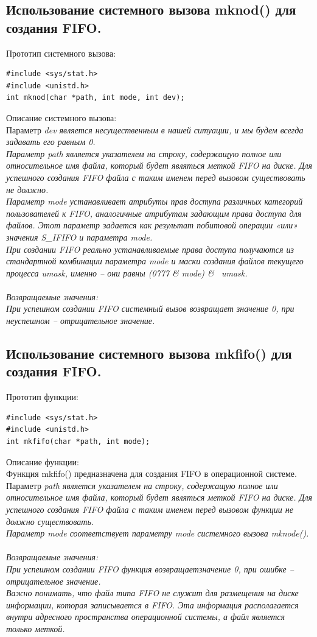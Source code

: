 \documentclass[a4paper]{article}
\begin{document}
\subsection{\Large Использование системного вызова mknod() для создания FIFO.}
Прототип системного вызова:
\begin{verbatim}
#include <sys/stat.h>
#include <unistd.h>
int mknod(char *path, int mode, int dev);  
\end{verbatim}
Описание системного вызова:\\
Параметр \sl dev \rm является несущественным в нашей ситуации, и мы будем всегда задавать его равным 0.\\
Параметр \sl path \rm является указателем на строку, содержащую полное или относительное имя файла, который будет являться меткой FIFO на диске. Для успешного создания FIFO файла с таким именем перед вызовом существовать не должно.\\
Параметр \sl mode \rm устанавливает атрибуты прав доступа различных категорий пользователей к FIFO, аналогичные атрибутам задающим права доступа для файлов. Этот параметр задается как результат побитовой операции «или» значения S\_IFIFO и параметра mode.\\
При создании FIFO реально устанавливаемые права доступа получаются из стандартной комбинации параметра \sl mode \rm и маски создания файлов текущего процесса \sl umask, \rm именно – они равны \sl (0777 \& mode) \& ~umask.\\\\
\rm Возвращаемые значения:\\
При успешном создании FIFO системный вызов возвращает значение 0, при неуспешном – отрицательное значение.

\subsection{\Large Использование системного вызова mkfifo() для создания FIFO.}
Прототип функции:
\begin{verbatim}
#include <sys/stat.h>
#include <unistd.h>
int mkfifo(char *path, int mode);  
\end{verbatim}
Описание функции:\\
Функция mkfifo() предназначена для создания FIFO в операционной системе.\\
Параметр \sl path \rm является указателем на строку, содержащую полное или относительное имя файла, который будет являться меткой FIFO на диске. Для успешного создания FIFO файла с таким именем перед вызовом функции не должно существовать.\\
Параметр \sl mode \rm соответствует параметру mode системного вызова mknode().\\\\
Возвращаемые значения:\\
При успешном создании FIFO функция возвращаетзначение 0, при ошибке – отрицательное значение.\\
Важно понимать, что файл типа FIFO не служит для размещения на диске информации, которая записывается в FIFO. Эта информация располагается внутри адресного пространства операционной системы, а файл является только меткой.
\end{document}

